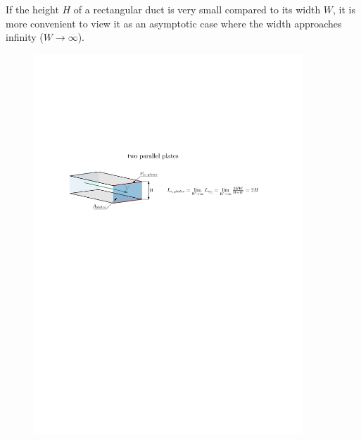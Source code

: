 If the height $H$ of a rectangular duct is very small compared to its width $W$, it is more convenient to view it as an asymptotic case where the width approaches infinity ($W \to \infty$).
\begin{figure}[H]
    \centering
    \includegraphics[width=0.9\textwidth]{src/02_foundations/fig_wetted-perimeter-plates.pdf}
    \label{fig:wetted-plates}
\end{figure}
\newpage
